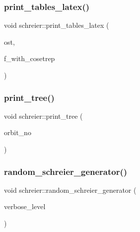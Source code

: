 \mbox{\label{classschreier_ae93a81953cef362ac7cec6f33b39eb6a}} 
\subsubsection{\texorpdfstring{print\+\_\+tables\+\_\+latex()}{print\_tables\_latex()}}
{\footnotesize\ttfamily void schreier\+::print\+\_\+tables\+\_\+latex (\begin{DoxyParamCaption}\item[{ostream \&}]{ost,  }\item[{\mbox{\hyperlink{galois_8h_a09fddde158a3a20bd2dcadb609de11dc}{I\+NT}}}]{f\+\_\+with\+\_\+cosetrep }\end{DoxyParamCaption})}

\mbox{\label{classschreier_a061ee745522fd39eef92cdd519869c99}} 
\subsubsection{\texorpdfstring{print\+\_\+tree()}{print\_tree()}}
{\footnotesize\ttfamily void schreier\+::print\+\_\+tree (\begin{DoxyParamCaption}\item[{\mbox{\hyperlink{galois_8h_a09fddde158a3a20bd2dcadb609de11dc}{I\+NT}}}]{orbit\+\_\+no }\end{DoxyParamCaption})}

\mbox{\label{classschreier_a0f5d195438630963accd737f56c1214f}} 
\subsubsection{\texorpdfstring{random\+\_\+schreier\+\_\+generator()}{random\_schreier\_generator()}}
{\footnotesize\ttfamily void schreier\+::random\+\_\+schreier\+\_\+generator (\begin{DoxyParamCaption}\item[{\mbox{\hyperlink{galois_8h_a09fddde158a3a20bd2dcadb609de11dc}{I\+NT}}}]{verbose\+\_\+level }\end{DoxyParamCaption})}

